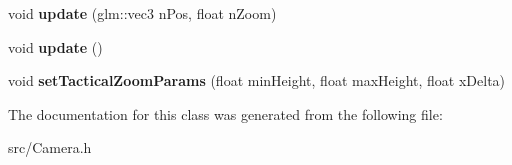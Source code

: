 \begin{DoxyCompactItemize}
\mbox{\label{classdarksun_1_1_camera_a6220dfd11bd7fc19dfef62864863382c}} 
void {\bfseries update} (glm\+::vec3 n\+Pos, float n\+Zoom)
\item 
\mbox{\label{classdarksun_1_1_camera_ae927590964138c4b0e05dbd6f797f72f}} 
void {\bfseries update} ()
\item 
\mbox{\label{classdarksun_1_1_camera_ad26e2a3a7fe1ede6b20dd3ec9b082396}} 
void {\bfseries set\+Tactical\+Zoom\+Params} (float min\+Height, float max\+Height, float x\+Delta)
\end{DoxyCompactItemize}


The documentation for this class was generated from the following file\+:\begin{DoxyCompactItemize}
\item 
src/Camera.\+h\end{DoxyCompactItemize}
